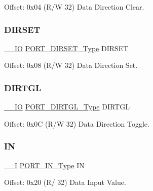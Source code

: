 Offset\+: 0x04 (R/W 32) Data Direction Clear. 

\mbox{\label{struct_port_group_a0bee31d59989e54e9748f3f31a71e1a5}} 
\subsubsection{\texorpdfstring{DIRSET}{DIRSET}}
{\footnotesize\ttfamily \mbox{\hyperlink{core__cm0plus_8h_aec43007d9998a0a0e01faede4133d6be}{\+\_\+\+\_\+\+IO}} \mbox{\hyperlink{union_p_o_r_t___d_i_r_s_e_t___type}{P\+O\+R\+T\+\_\+\+D\+I\+R\+S\+E\+T\+\_\+\+Type}} D\+I\+R\+S\+ET}



Offset\+: 0x08 (R/W 32) Data Direction Set. 

\mbox{\label{struct_port_group_acc3c81a100cc3d9fa45d164b26667492}} 
\subsubsection{\texorpdfstring{DIRTGL}{DIRTGL}}
{\footnotesize\ttfamily \mbox{\hyperlink{core__cm0plus_8h_aec43007d9998a0a0e01faede4133d6be}{\+\_\+\+\_\+\+IO}} \mbox{\hyperlink{union_p_o_r_t___d_i_r_t_g_l___type}{P\+O\+R\+T\+\_\+\+D\+I\+R\+T\+G\+L\+\_\+\+Type}} D\+I\+R\+T\+GL}



Offset\+: 0x0C (R/W 32) Data Direction Toggle. 

\mbox{\label{struct_port_group_a8ec8f85412233cb9993f9622ec106aa0}} 
\subsubsection{\texorpdfstring{IN}{IN}}
{\footnotesize\ttfamily \mbox{\hyperlink{core__cm0plus_8h_af63697ed9952cc71e1225efe205f6cd3}{\+\_\+\+\_\+I}} \mbox{\hyperlink{union_p_o_r_t___i_n___type}{P\+O\+R\+T\+\_\+\+I\+N\+\_\+\+Type}} IN}



Offset\+: 0x20 (R/ 32) Data Input Value. 

\mbox{\label{struct_port_group_a2ee0b79ec23d5e8846e2e40e668954b6}} 
